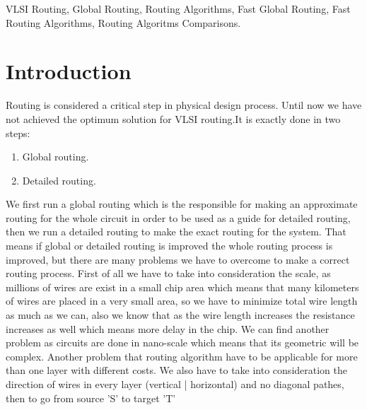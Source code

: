 \documentclass[conference]{IEEEtran}
\begin{document}

\begin{IEEEkeywords}
VLSI Routing, Global Routing, Routing Algorithms, Fast Global Routing, Fast Routing Algorithms, Routing Algoritms Comparisons.
\end{IEEEkeywords}


\section{Introduction}

Routing is considered a critical step in physical design process. Until now we have not achieved the optimum solution for VLSI routing.It is exactly done in two steps:
\begin{enumerate}
    \item Global routing.
    \item Detailed routing.
\end{enumerate}
We first run a global routing which is the responsible for making an approximate routing for the whole circuit in order to be used as a guide for detailed routing, then we run a detailed routing to make the exact routing for the system. That means if global or detailed routing is improved the whole routing process is improved, but there are many problems we have to overcome to make a correct routing process. First of all we have to take into consideration the scale, as millions of wires are exist in a small chip area which means that many kilometers of wires are placed in a very small area, so we have to minimize total wire length as much as we can, also we know that as the wire length increases the resistance increases as well which means more delay in the chip. We can find another problem as circuits are done in nano-scale which means that its geometric will be complex. Another problem that routing algorithm have to be applicable for more than one layer with different costs. We also have to take into consideration the direction of wires in every layer (vertical | horizontal) and no diagonal pathes, then to go from source 'S' to target 'T'
\end{document}
